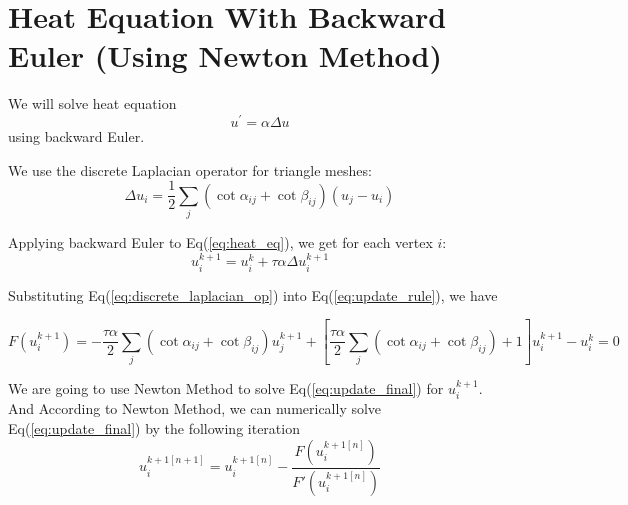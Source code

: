 \documentclass{article}
\begin{document}
\section*{Heat Equation With Backward Euler (Using Newton Method)}
We will solve heat equation 
\begin{equation} \label{eq:heat_eq}
u^{\prime} = \alpha \Delta u
\end{equation}
using backward Euler. 

We use the discrete Laplacian operator for triangle meshes:
\begin{equation} \label{eq:discrete_laplacian_op}
\Delta u_i = \frac{1}{2}\sum_{j} (\cot{\alpha_{ij}} + \cot{\beta_{ij}})(u_j - u_i)
\end{equation}

Applying backward Euler to Eq(\ref{eq:heat_eq}), we get for each vertex $i$:
\begin{equation} \label{eq:update_rule}
u_i^{k+1} = u_i^{k} + \tau \alpha \Delta u_i^{k+1}
\end{equation}

Substituting Eq(\ref{eq:discrete_laplacian_op}) into Eq(\ref{eq:update_rule}), we have

\begin{equation} \label{eq:update_final}
F(u_i^{k+1}) = -\frac{\tau\alpha}{2} \sum_{j}(\cot \alpha_{ij} + \cot \beta_{ij}) u_j^{k+1} + \left[\frac{\tau\alpha}{2}\sum_{j}(\cot \alpha_{ij} + \cot \beta_{ij}) + 1\right]u_i^{k+1}  - u_i^k = 0
\end{equation}

We are going to use Newton Method to solve Eq(\ref{eq:update_final}) for $u_i^{k+1}$.
And According to Newton Method, we can numerically solve Eq({\ref{eq:update_final}}) by the following iteration
\begin{equation} \label{eq:newton_iter}
	u_i^{{k+1}[n+1]} = 	u_i^{{k+1}[n]} - \frac{F(u_i^{{k+1}[n]})}{F'(u_i^{{k+1}[n]})}
\end{equation}
\end{document}
